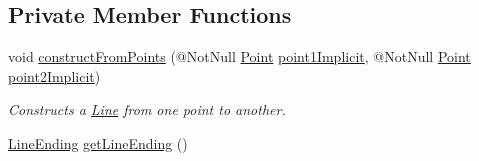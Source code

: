 \subsection*{Private Member Functions}
\begin{DoxyCompactItemize}
\item 
void \hyperlink{classcom_1_1aarrelaakso_1_1drawl_1_1_line_ae037bf2dd2bb2a21ba2d45a752cad9f5}{construct\+From\+Points} (@Not\+Null \hyperlink{classcom_1_1aarrelaakso_1_1drawl_1_1_point}{Point} \hyperlink{classcom_1_1aarrelaakso_1_1drawl_1_1_line_a48220286707ae05387f9c99d9e08784c}{point1\+Implicit}, @Not\+Null \hyperlink{classcom_1_1aarrelaakso_1_1drawl_1_1_point}{Point} \hyperlink{classcom_1_1aarrelaakso_1_1drawl_1_1_line_a055d1e743c66cc808f108664b38d7de2}{point2\+Implicit})
\begin{DoxyCompactList}\small\item\em Constructs a \hyperlink{classcom_1_1aarrelaakso_1_1drawl_1_1_line}{Line} from one point to another. \end{DoxyCompactList}\item 
\hyperlink{classcom_1_1aarrelaakso_1_1drawl_1_1_line_ending}{Line\+Ending} \hyperlink{classcom_1_1aarrelaakso_1_1drawl_1_1_line_a87a0f6162575962d65f6f8e186334787}{get\+Line\+Ending} ()
\end{DoxyCompactItemize}

